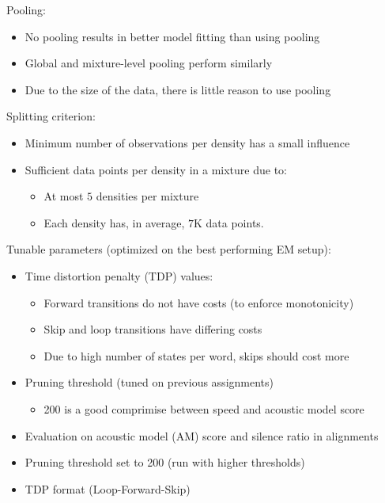 \documentclass[11pt, a4paper, landscape]{article}
\begin{document}
\NewPage{}
\vfill
Pooling:
\begin{itemize}
	\item No pooling results in better model fitting than using pooling 
	\item Global and mixture-level pooling perform similarly 
  \item Due to the size of the data, there is little reason to use pooling
\end{itemize}
\vspace{20pt}
Splitting criterion:
\begin{itemize}
	\item Minimum number of observations per density has a small influence
	\item Sufficient data points per density in a mixture due to:
	\begin{itemize}
		\item At most $5$ densities per mixture
		\item Each density has, in average, $7$K data points.
	\end{itemize}
\end{itemize}
\vfill

\NewPage{}
\vfill
Tunable parameters (optimized on the best performing EM setup):
\begin{itemize}
	\item Time distortion penalty (TDP) values:
    \begin{itemize}
      \item Forward transitions do not have costs (to enforce monotonicity)
      \item Skip and loop transitions have differing costs
      \item Due to high number of states per word, skips should cost more
    \end{itemize}
	\item Pruning threshold (tuned on previous assignments)
	\begin{itemize}
		\item 200 is a good comprimise between speed and acoustic model score
	\end{itemize}
\end{itemize}
\vfill

\NewPage{}
\vfill
\begin{itemize}
  \item Evaluation on acoustic model (AM) score and silence ratio in alignments
  \item Pruning threshold set to 200 (run with higher thresholds)
  \item TDP format (Loop-Forward-Skip) 
\end{itemize}
\end{document}
